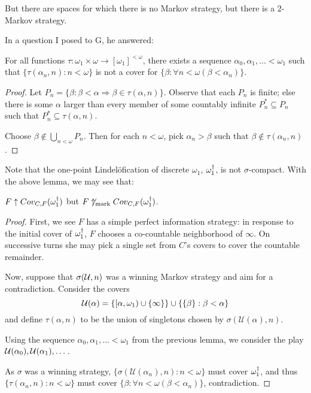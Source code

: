   But there are spaces for which there is no Markov strategy, but there is a $2$-Markov strategy.

  In a question I posed to G, he answered:

  \begin{lemma}
    For all functions $\tau:\omega_1\times\omega \rightarrow [\omega_1]^{<\omega}$, there exists a sequence $\alpha_0, \alpha_1, \dots < \omega_1$ such that $\{\tau(\alpha_n,n): n<\omega\}$ is not a cover for $\{\beta:\forall n<\omega (\beta < \alpha_n)\}$.
  \end{lemma} 

  \begin{proof}
    Let $P_n = \{\beta: \beta < \alpha \Rightarrow \beta \in \tau(\alpha, n)\}$. Observe that each $P_n$ is finite; else there is some $\alpha$ larger than every member of some countably infinite $P_n^*\subseteq P_n$ such that $P_n^* \subseteq \tau(\alpha, n)$.

    Choose $\beta \not\in \bigcup_{n<\omega} P_n$. Then for each $n<\omega$, pick $\alpha_n>\beta$ such that $\beta \not\in \tau(\alpha_n, n)$.
  \end{proof}

  Note that the one-point Lindel\"ofication of discrete $\omega_1$, $\omega_1^\dagger$, is not $\sigma$-compact. With the above lemma, we may see that:

  \begin{example}
    $F \uparrow Cov_{C,F}(\omega_1^\dagger)$ but $F \not\uparrow_{\text{mark}} Cov_{C,F}(\omega_1^\dagger)$.
  \end{example}

  \begin{proof}
    First, we see $F$ has a simple perfect information strategy: in response to the initial cover of $\omega_1^\dagger$, $F$ chooses a co-countable neighborhood of $\infty$. On successive turns she may pick a single set from $C$'s covers to cover the countable remainder.

    Now, suppose that $\sigma(\mathcal{U}, n)$ was a winning Markov strategy and aim for a contradiction. Consider the covers \[\mathcal{U}(\alpha) = \{[\alpha,\omega_1)\cup\{\infty\}\} \cup \{\{\beta\}:\beta < \alpha\}\] and define $\tau(\alpha,n)$ to be the union of singletons chosen by $\sigma(\mathcal{U}(\alpha),n)$. 

    Using the sequence $\alpha_0, \alpha_1,\dots<\omega_1$ from the previous lemma, we consider the play $\mathcal{U}(\alpha_0),\mathcal{U}(\alpha_1),\dots$.

    As $\sigma$ was a winning strategy, $\{\sigma(\mathcal{U}(\alpha_n),n): n<\omega\}$ must cover $\omega_1^\dagger$, and thus $\{\tau(\alpha_n,n): n<\omega\}$ must cover $\{\beta:\forall n<\omega (\beta < \alpha_n)\}$, contradiction.
  \end{proof}

